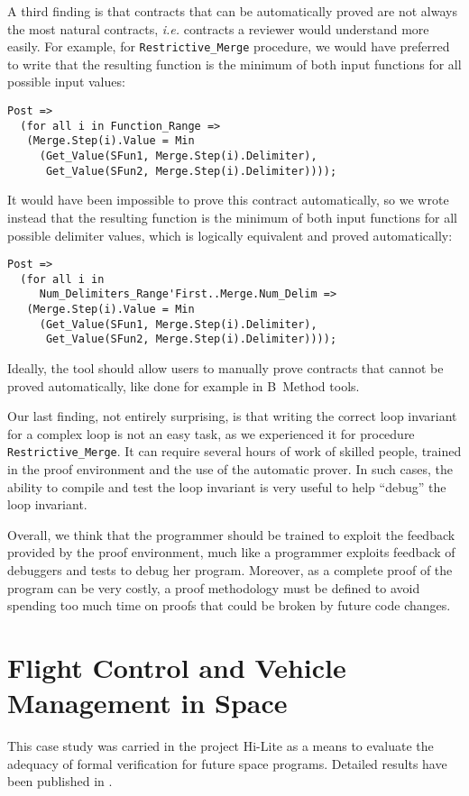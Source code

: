 \documentclass[10pt,a4paper,twocolumn]{article}
\newcommand{\hilite}{Hi-Lite\xspace}
\newcommand{\ie}{\textit{i.e.}\xspace}
\newcommand{\SPARK}[1]{\lstinline[language=Ada,basicstyle={\footnotesize
      \sffamily},framesep=0pt]$#1$}
\begin{document}
A third finding is that contracts that can be automatically proved are
not always the most natural contracts, \ie contracts a reviewer would
understand more easily. For example, for \SPARK{Restrictive_Merge}
procedure, we would have preferred to write that the resulting function
is the minimum of both input functions for all possible input
values:
\begin{lstlisting}
Post =>
  (for all i in Function_Range =>
   (Merge.Step(i).Value = Min
     (Get_Value(SFun1, Merge.Step(i).Delimiter),
      Get_Value(SFun2, Merge.Step(i).Delimiter))));
\end{lstlisting}
It would have been impossible to prove this contract automatically, so we wrote
instead that the resulting function is the minimum of both input functions for
all possible delimiter values, which is logically equivalent and proved
automatically:
\begin{lstlisting}
Post =>
  (for all i in
     Num_Delimiters_Range'First..Merge.Num_Delim =>
   (Merge.Step(i).Value = Min
     (Get_Value(SFun1, Merge.Step(i).Delimiter),
      Get_Value(SFun2, Merge.Step(i).Delimiter))));
\end{lstlisting}
Ideally, the tool should allow users to manually prove contracts that cannot be
proved automatically, like done for example in B~Method tools.

Our last finding, not entirely surprising, is that writing the correct
loop invariant for a complex loop is not an easy task, as we experienced
it for procedure \SPARK{Restrictive_Merge}. It can require several
hours of work of skilled people, trained in the proof environment and
the use of the automatic prover. In such cases, the ability to
compile and test the loop invariant is very useful to help ``debug''
the loop invariant.

Overall, we think that the programmer should be trained to exploit the
feedback provided by the proof environment, much like a programmer
exploits feedback of debuggers and tests to debug her program.
Moreover, as a complete proof of the program can be very costly, a proof
methodology must be defined to avoid spending too much time on proofs
that could be broken by future code changes.

\section{Flight Control and Vehicle Management in Space}
\label{sec:space}

This case study was carried in the project \hilite as a means to evaluate the
adequacy of formal verification for future space programs. Detailed results
have been published in \cite{lesens:2013:dasia}.
\end{document}
